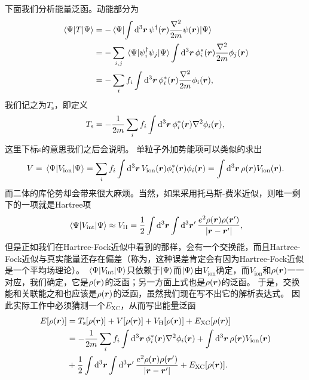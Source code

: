 下面我们分析能量泛函。动能部分为
\[
    \begin{aligned}
        \mel{\Psi}{T}{\Psi} &= - \mel{\Psi}{\int \dd[3]{\vb*{r}} \psi^\dagger(\vb*{r}) \frac{\laplacian}{2m} \psi(\vb*{r})}{\Psi} \\
        &= - \sum_{i, j} \mel{\Psi}{\psi_i^\dagger \psi_j}{\Psi} \int \dd[3]{\vb*{r}} \phi^*_i(\vb*{r}) \frac{\laplacian}{2m} \phi_j(\vb*{r}) \\
        &= - \sum_i f_i \int \dd[3]{\vb*{r}} \phi^*_i(\vb*{r}) \frac{\laplacian}{2m} \phi_i(\vb*{r}),
    \end{aligned}
\]
我们记之为$T_\text{s}$，即定义
\begin{equation}
    T_\text{s} = - \frac{1}{2m} \sum_i f_i \int \dd[3]{\vb*{r}} \phi_i^*(\vb*{r}) \laplacian \phi_i(\vb*{r}),
\end{equation}
这里下标s的意思我们之后会说明。
单粒子外加势能项可以类似的求出
\begin{equation}
    V = \mel{\Psi}{{V}_\text{ion}}{\Psi} = \sum_i f_i \int \dd[3]{\vb*{r}} V_{\text{ion}}(\vb*{r}) \phi_i^*(\vb*{r}) \phi_i(\vb*{r}) = \int \dd[3]{\vb*{r}} \rho(\vb*{r}) V_\text{ion}(\vb*{r}).
\end{equation}
而二体的库伦势却会带来很大麻烦。当然，如果采用托马斯-费米近似，则唯一剩下的一项就是Hartree项
\begin{equation}
    \mel{\Psi}{{V}_\text{int}}{\Psi} \approx V_{\text{H}} = \frac{1}{2} \int \dd[3]{\vb*{r}} \int \dd[3]{\vb*{r}'} \frac{e^2 \rho(\vb*{r}) \rho(\vb*{r}')}{\abs{\vb*{r} - \vb*{r}'}},
\end{equation}
但是正如我们在Hartree-Fock近似中看到的那样，会有一个交换能，而且Hartree-Fock近似与真实能量还存在偏差（称为，这种误差肯定会有因为Hartree-Fock近似是一个平均场理论）。
$\mel{\Psi}{{V}_\text{int}}{\Psi}$只依赖于$\ket{\Psi}$而$\ket{\Psi}$由$V_\text{ion}$确定，而$V_\text{ion}$和$\rho(\vb*{r})$一一对应，我们确定，它是$\rho(\vb*{r})$的泛函；另一方面上式也是$\rho(\vb*{r})$的泛函。
于是，交换能和关联能之和也应该是$\rho(\vb*{r})$的泛函，虽然我们现在写不出它的解析表达式。
因此实际工作中必须猜测一个$E_\text{XC}$，从而写出能量泛函
\begin{equation}
    \begin{aligned}
        E[\rho(\vb*{r})] &= T_\text{s}[\rho(\vb*{r})] + V[\rho(\vb*{r})] + V_\text{H}[\rho(\vb*{r})] + E_\text{XC} [\rho(\vb*{r})] \\
        &= - \frac{1}{2m} \sum_i f_i \int \dd[3]{\vb*{r}} \phi_i^*(\vb*{r}) \laplacian \phi_i(\vb*{r})
        + \int \dd[3]{\vb*{r}} \rho(\vb*{r}) V_\text{ion}(\vb*{r}) \\
        &+ \frac{1}{2} \int \dd[3]{\vb*{r}} \int \dd[3]{\vb*{r}'} \frac{e^2 \rho(\vb*{r}) \rho(\vb*{r}')}{\abs{\vb*{r} - \vb*{r}'}} + E_\text{XC} [\rho(\vb*{r})].
    \end{aligned}
    \label{eq:kohn-sham-functional}
\end{equation}
